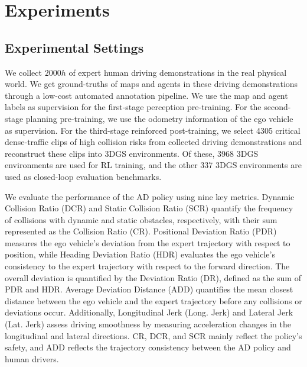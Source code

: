 \section{Experiments}
\subsection{Experimental Settings}
 We collect $2000h$ of expert human driving demonstrations in the real physical world. 
We get ground-truths of maps and agents in these driving demonstrations through a low-cost automated annotation pipeline. We use the map and agent labels as supervision for the first-stage perception pre-training. For the second-stage planning pre-training, we use the odometry information of the ego vehicle as supervision.
For the third-stage reinforced post-training,  we select 4305 critical dense-traffic clips of high collision risks from collected driving demonstrations and reconstruct these clips into 3DGS environments.
Of these, 3968 3DGS environments are used for RL training, and the other 337 3DGS environments are used as closed-loop evaluation benchmarks. 

We evaluate the performance of the AD policy using nine key metrics. Dynamic Collision Ratio (DCR) and Static Collision Ratio (SCR) quantify the frequency of collisions with dynamic and static obstacles, respectively, with their sum represented as the Collision Ratio (CR). Positional Deviation Ratio (PDR) measures the ego vehicle’s deviation from the expert trajectory with respect to position, while Heading Deviation Ratio (HDR) evaluates the ego vehicle’s consistency to the expert trajectory with respect to the forward direction. The overall deviation is quantified by the Deviation Ratio (DR), defined as the sum of PDR and HDR. Average Deviation Distance (ADD) quantifies the mean closest distance between the ego vehicle and the expert trajectory before any collisions or deviations occur. Additionally, Longitudinal Jerk (Long. Jerk) and Lateral Jerk (Lat. Jerk) assess driving smoothness by measuring acceleration changes in the longitudinal and lateral directions. CR, DCR, and SCR mainly reflect the policy's safety, and ADD reflects the trajectory consistency between the AD policy and human drivers.

